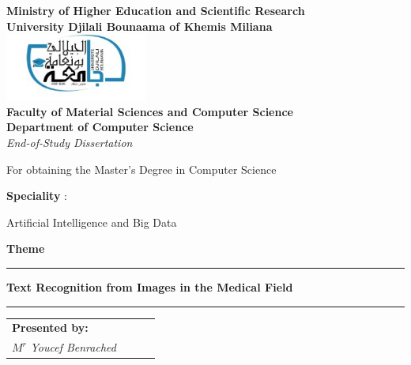 \sloppy
\begin{titlepage}
\begin{center}

{\bf Ministry of Higher Education and Scientific Research} \vspace{0.25cm}\\
{\bf {\large University Djilali Bounaama of Khemis Miliana}}\\
\includegraphics[width=0.35\textwidth]{univ-dbkm.jpg}\\
{\bf Faculty of Material Sciences and Computer Science
} \\ {\bf Department of Computer Science }\\
\vspace{0.2cm}
\Huge{\emph{{{\it {End-of-Study Dissertation }}}}}\\
\vspace{0.1cm}
\normalsize
\begin{center}
For obtaining the Master's Degree in Computer Science
\end{center}
\normalsize\textbf{Speciality }:\\
\normalsize
\begin{center}
Artificial Intelligence and Big Data
\end{center}
\vspace{0.09cm}
\Huge\textbf{Theme}\\
\noindent\rule{\textwidth}{0.9mm}
\Large{{\textbf{
Text Recognition from Images in the Medical Field
}}}
\noindent\rule{\textwidth}{0.9mm}
\end{center}
\begin{center}
\normalsize %
\begin{tabular}{llll}
\textbf{\textbf{Presented by:}} \hspace{10cm}\\%
\hspace{0cm} $M^{r}$ \textsl{Youcef Benrached}  %
\\



\end{tabular}
\end{center}
\end{titlepage}
